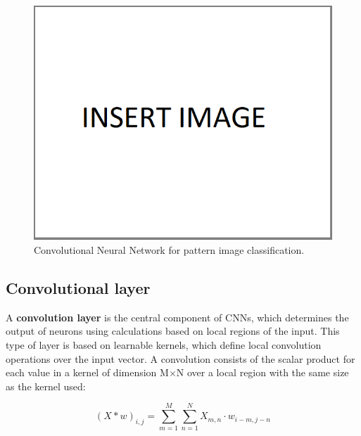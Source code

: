\begin{figure}[!h]
    \centering
    \includegraphics[scale=.45]{imagenes/insertImage.png}
    \caption{Convolutional Neural Network for pattern image classification.}
    \label{fig:convNet}
\end{figure}

\subsection{Convolutional layer}
A \textbf{convolution layer} is the central component of CNNs, which determines the output of 
neurons using calculations based on local regions of the input. This type of layer is based on 
learnable kernels, which define local convolution operations over the input vector. A 
convolution consists of the scalar product for each value in a kernel of dimension M$\times$N 
over a local region with the same size as the kernel used:

\begin{equation} \label{eq:convolution}
    (X \ast w)_{i, j} = \sum_{m=1}^M \sum_{n=1}^{N} X_{m, n} \cdot w_{i-m, j-n}
\end{equation}

